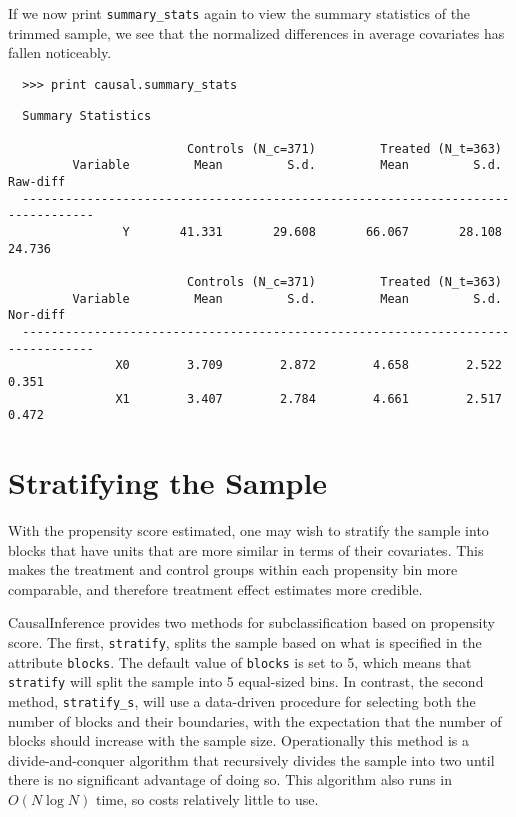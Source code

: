 \documentclass[12pt]{article}
\theoremstyle{definition}
\theoremstyle{definition}
\theoremstyle{definition}
\theoremstyle{remark}
\begin{document}
If we now print \texttt{summary\_stats} again to view the summary statistics of the trimmed sample, we see that the normalized differences in average covariates has fallen noticeably.
\begin{verbatim}
  >>> print causal.summary_stats
\end{verbatim}
\begin{verbatim}
  Summary Statistics
  
                         Controls (N_c=371)         Treated (N_t=363)             
         Variable         Mean         S.d.         Mean         S.d.     Raw-diff
  --------------------------------------------------------------------------------
                Y       41.331       29.608       66.067       28.108       24.736
  
                         Controls (N_c=371)         Treated (N_t=363)             
         Variable         Mean         S.d.         Mean         S.d.     Nor-diff
  --------------------------------------------------------------------------------
               X0        3.709        2.872        4.658        2.522        0.351
               X1        3.407        2.784        4.661        2.517        0.472
\end{verbatim}


\section{Stratifying the Sample} \label{sec.e}

With the propensity score estimated, one may wish to stratify the sample into blocks that have units that are more similar in terms of their covariates. This makes the treatment and control groups within each propensity bin more comparable, and therefore treatment effect estimates more credible.

CausalInference provides two methods for subclassification based on propensity score. The first, \texttt{stratify}, splits the sample based on what is specified in the attribute \texttt{blocks}. The default value of \texttt{blocks} is set to 5, which means that \texttt{stratify} will split the sample into 5 equal-sized bins. In contrast, the second method, \texttt{stratify\_s}, will use a data-driven procedure for selecting both the number of blocks and their boundaries, with the expectation that the number of blocks should increase with the sample size. Operationally this method is a divide-and-conquer algorithm that recursively divides the sample into two until there is no significant advantage of doing so. This algorithm also runs in $O(N \log N)$ time, so costs relatively little to use. 
\end{document}
